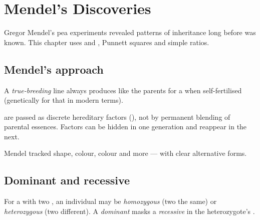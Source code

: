 \chapter{Mendel's Discoveries}\label{ch:g9:mendel}

Gregor Mendel's pea experiments revealed patterns of inheritance long
before  was known. This chapter uses  and ,
Punnett squares and simple ratios.

\section{Mendel's approach}

\begin{definition}\label{def:g9:mendel:true}
A \emph{true-breeding} line always produces 
like the parents for a  when self-fertilised (genetically 
for that  in modern terms).
\end{definition}

\begin{proposition}\label{prop:g9:mendel:part}
 are passed as discrete hereditary factors (), not by permanent
blending of parental essences. Factors can be hidden in one generation and
reappear in the next.
\end{proposition}
\admitted

\begin{example}\label{ex:g9:mendel:pea}
Mendel tracked  shape,  colour,  colour and more --- 
with clear alternative forms.
\end{example}

\section{Dominant and recessive}

\begin{definition}\label{def:g9:mendel:alleles}
For a  with two , an individual may be
\emph{homozygous} (two the same) or
\emph{heterozygous} (two different). A
\emph{dominant}  masks a
\emph{recessive} in the heterozygote's .
\end{definition}

